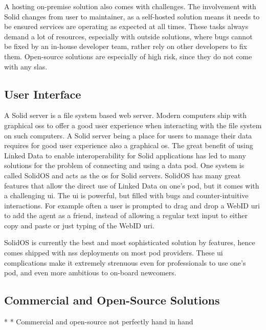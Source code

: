 A hosting on-premise solution also comes with challenges. The involvement with Solid changes from user to maintainer, as a self-hosted solution means it needs to be ensured services are operating as expected at all times. These tasks always demand a lot of resources, especially with outside solutions, where bugs cannot be fixed by an in-house developer team, rather rely on other developers to fix them. Open-source solutions are especially of high risk, since they do not come with any \glspl{sla}.

\subsection{User Interface}

A Solid server is a file system based web server. Modern computers ship with graphical \glspl{os} to offer a good user experience when interacting with the file system on such computers. A Solid server being a place for users to manage their data requires for good user experience also a graphical \gls{os}. The great benefit of using Linked Data to enable interoperability for Solid applications has led to many solutions for the problem of connecting and using a data pod. One system is called SolidOS \cite{solidos} and acts as the \gls{os} for Solid servers. SolidOS has many great features that allow the direct use of Linked Data on one's pod, but it comes with a challenging \gls{ui}. The \gls{ui} is powerful, but filled with bugs and counter-intuitive interactions. For example often a user is prompted to drag and drop a WebID \gls{uri} to add the agent as a friend, instead of allowing a regular text input to either copy and paste or just typing of the WebID \gls{uri}.

SolidOS is currently the best and most sophisticated solution by features, hence comes shipped with \gls{nss} deployments on most pod providers. These \gls{ui} complications make it extremely strenuous even for professionals to use one's pod, and even more ambitious to on-board newcomers.

\subsection{Commercial and Open-Source Solutions}



* 
* Commercial and open-source not perfectly hand in hand
